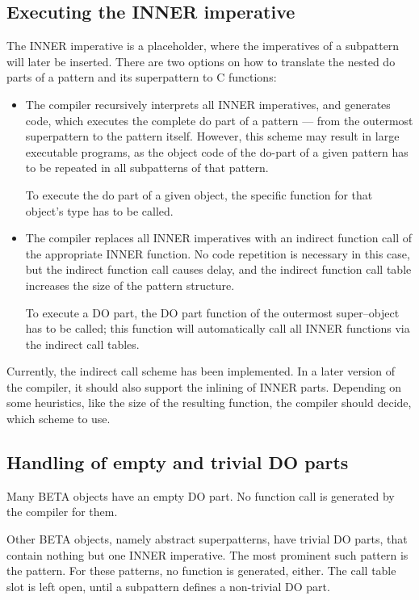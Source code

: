 \subsection{Executing the INNER imperative}
The INNER imperative is a placeholder, where the imperatives of a
subpattern will later be inserted.  There are two options on how
to translate the nested do parts of a pattern and its superpattern
to C functions:
\begin{itemize}
\item The compiler recursively interprets all INNER imperatives,
    and generates code, which executes the complete do part of a
    pattern --- from the outermost superpattern to the pattern
    itself.  However, this scheme may result in large executable
    programs, as the object code of the do-part of a given
    pattern has to be repeated in all subpatterns of that
    pattern.

    To execute the do part of a given object, the specific
    function for that object's type has to be called.
\item The compiler replaces all INNER imperatives with an
    indirect function call of the appropriate INNER function.  No
    code repetition is necessary in this case, but the indirect
    function call causes delay, and the indirect function call
    table increases the size of the pattern structure.

    To execute a DO part, the DO part function of the
    outermost super--object has to be called; this function
    will automatically call all INNER functions via the
    indirect call tables.
\end{itemize}

Currently, the indirect call scheme has been implemented.  In a
later version of the compiler, it should also support the
inlining of INNER parts.  Depending on some heuristics, like the
size of the resulting function, the compiler should decide,
which scheme to use.

\subsection{Handling of empty and trivial DO parts}
Many BETA objects have an empty DO part.  No function call is
generated by the compiler for them.

Other BETA objects, namely abstract superpatterns, have trivial
DO parts, that contain nothing but one INNER imperative.  The
most prominent such pattern is the  pattern.  For
these patterns, no function is generated, either.  The call table
slot is left open, until a subpattern defines a non-trivial DO
part.

